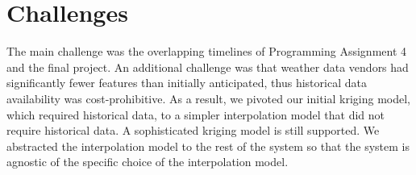 \section{Challenges}
The main challenge was the overlapping timelines of Programming Assignment 4 and the final project. 
An additional challenge was that weather data vendors had significantly fewer features than initially anticipated,
thus historical data availability was cost-prohibitive.
As a result, we pivoted our initial kriging model, which required historical data,
to a simpler interpolation model that did not require historical data.
A sophisticated kriging model is still supported. We abstracted the interpolation model to the rest of the system so that the system is agnostic of the specific choice of the interpolation model.